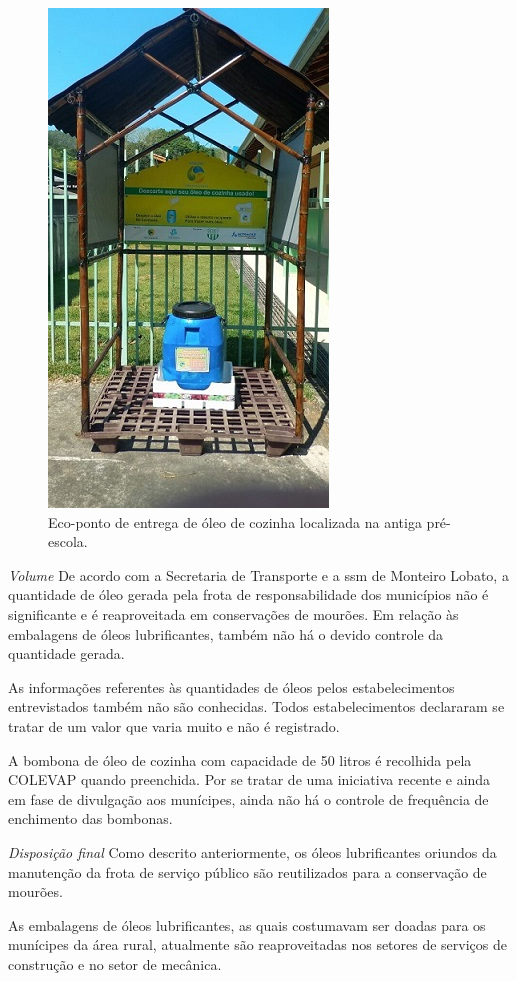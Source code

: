\begin{description}
	
	\begin{figure}
		\centering
		\includegraphics[width=0.40\linewidth]{produtos/prodtres/image095}
		\caption{Eco-ponto de entrega de óleo de cozinha localizada na antiga pré-escola.}
		\label{fig:image095}
	\end{figure}
	
	
	\subitem \textit{Volume} 
	De acordo com a Secretaria de Transporte e a \gls{ssm} de Monteiro Lobato, a quantidade de óleo gerada pela frota de responsabilidade dos municípios não é significante e é reaproveitada em conservações de mourões. Em relação às embalagens de óleos lubrificantes, também não há o devido controle da quantidade gerada.
	
	As informações referentes às quantidades de óleos pelos estabelecimentos entrevistados também não são conhecidas. Todos estabelecimentos declararam se tratar de um valor que varia muito e não é registrado.
	
	A bombona de óleo de cozinha com capacidade de 50 litros é recolhida pela COLEVAP quando preenchida. Por se tratar de uma iniciativa recente e ainda em fase de divulgação aos munícipes, ainda não há o controle de frequência de enchimento das bombonas.
	
		\subitem \textit{Disposição final}
		Como descrito anteriormente, os óleos lubrificantes oriundos da manutenção da frota de serviço público são reutilizados para a conservação de mourões. 
	
	As embalagens de óleos lubrificantes, as quais costumavam ser doadas para os munícipes da área rural, atualmente são reaproveitadas nos setores de serviços de construção e no setor de mecânica.
	

\end{description}
